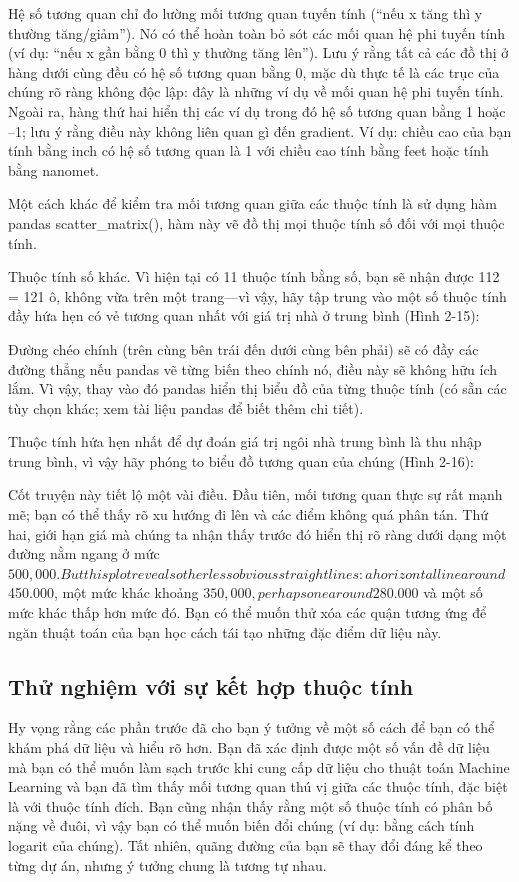 Hệ số tương quan chỉ đo lường mối tương quan tuyến tính (“nếu x tăng thì y thường tăng/giảm”). Nó có thể hoàn toàn bỏ sót các mối quan hệ phi tuyến tính (ví dụ: “nếu x gần bằng 0 thì y thường tăng lên”). Lưu ý rằng tất cả các đồ thị ở hàng dưới cùng đều có hệ số tương quan bằng 0, mặc dù thực tế là các trục của chúng rõ ràng không độc lập: đây là những ví dụ về mối quan hệ phi tuyến tính. Ngoài ra, hàng thứ hai hiển thị các ví dụ trong đó hệ số tương quan bằng 1 hoặc –1; lưu ý rằng điều này không liên quan gì đến gradient. Ví dụ: chiều cao của bạn tính bằng inch có hệ số tương quan là 1 với chiều cao tính bằng feet hoặc tính bằng nanomet.

Một cách khác để kiểm tra mối tương quan giữa các thuộc tính là sử dụng hàm pandas scatter\_matrix(), hàm này vẽ đồ thị mọi thuộc tính số đối với mọi thuộc tính.

Thuộc tính số khác. Vì hiện tại có 11 thuộc tính bằng số, bạn sẽ nhận được 112 = 121 ô, không vừa trên một trang—vì vậy, hãy tập trung vào một số thuộc tính đầy hứa hẹn có vẻ tương quan nhất với giá trị nhà ở trung bình (Hình 2-15):

Đường chéo chính (trên cùng bên trái đến dưới cùng bên phải) sẽ có đầy các đường thẳng nếu pandas vẽ từng biến theo chính nó, điều này sẽ không hữu ích lắm. Vì vậy, thay vào đó pandas hiển thị biểu đồ của từng thuộc tính (có sẵn các tùy chọn khác; xem tài liệu pandas để biết thêm chi tiết).

Thuộc tính hứa hẹn nhất để dự đoán giá trị ngôi nhà trung bình là thu nhập trung bình, vì vậy hãy phóng to biểu đồ tương quan của chúng (Hình 2-16):

Cốt truyện này tiết lộ một vài điều. Đầu tiên, mối tương quan thực sự rất mạnh mẽ; bạn có thể thấy rõ xu hướng đi lên và các điểm không quá phân tán. Thứ hai, giới hạn giá mà chúng ta nhận thấy trước đó hiển thị rõ ràng dưới dạng một đường nằm ngang ở mức $500,000. But this plot reveals other less obvious straight lines: a horizontal line around $450.000, một mức khác khoảng $350,000, perhaps one around $280.000 và một số mức khác thấp hơn mức đó. Bạn có thể muốn thử xóa các quận tương ứng để ngăn thuật toán của bạn học cách tái tạo những đặc điểm dữ liệu này.

\subsection{Thử nghiệm với sự kết hợp thuộc tính}

Hy vọng rằng các phần trước đã cho bạn ý tưởng về một số cách để bạn có thể khám phá dữ liệu và hiểu rõ hơn. Bạn đã xác định được một số vấn đề dữ liệu mà bạn có thể muốn làm sạch trước khi cung cấp dữ liệu cho thuật toán Machine Learning và bạn đã tìm thấy mối tương quan thú vị giữa các thuộc tính, đặc biệt là với thuộc tính đích. Bạn cũng nhận thấy rằng một số thuộc tính có phân bố nặng về đuôi, vì vậy bạn có thể muốn biến đổi chúng (ví dụ: bằng cách tính logarit của chúng). Tất nhiên, quãng đường của bạn sẽ thay đổi đáng kể theo từng dự án, nhưng ý tưởng chung là tương tự nhau.

